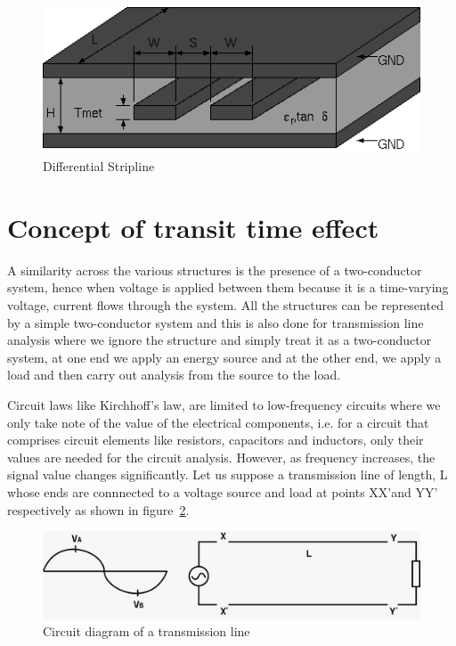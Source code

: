 \begin{figure}[h]
\centering
\includegraphics[width=1\linewidth]{./graphics/stripline}
\caption{Differential Stripline}
\label{fig:diff-stripline}
\end{figure}

\section{Concept of transit time effect}
A similarity across the various structures is the presence of a two-conductor system, hence when voltage is applied between them because it is a time-varying voltage, current flows through the system. All the structures can be represented by a simple two-conductor system and this is also done for transmission line analysis where we ignore the structure and simply treat it as a two-conductor system, at one end we apply an energy source and at the other end, we apply a load and then carry out analysis from the source to the load.

Circuit laws like Kirchhoff’s law, are limited to low-frequency circuits where we only take note of the value of the electrical components, i.e. for a circuit that comprises circuit elements like resistors, capacitors and inductors, only their values are needed for the circuit analysis. However, as frequency increases, the signal value changes significantly. Let us suppose a transmission line of length, L whose ends are connnected to a voltage source and load at points XX'and YY' respectively as shown in figure~\ref{fig:first}.
\begin{figure}[h]
\centering
\includegraphics[width=1\linewidth]{./graphics/fig2.7}
\caption{Circuit diagram of a transmission line}
\label{fig:first}
\end{figure}

